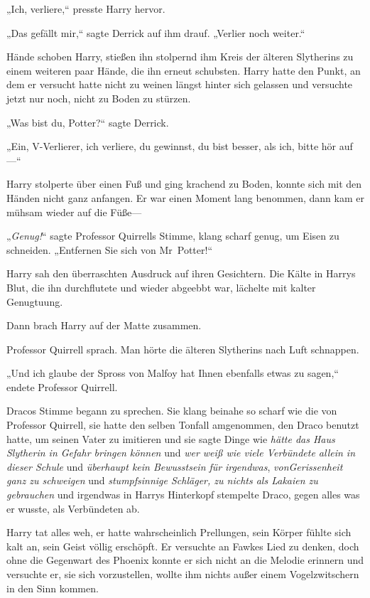 {„Ich, verliere,“ presste Harry hervor.

„Das gefällt mir,“ sagte Derrick auf ihm drauf. „Verlier noch weiter.“

\later

Hände schoben Harry, stießen ihn stolpernd ihm Kreis der älteren Slytherins zu einem weiteren paar Hände, die ihn erneut schubsten. Harry hatte den Punkt, an dem er versucht hatte nicht zu weinen längst hinter sich gelassen und versuchte jetzt nur noch, nicht zu Boden zu stürzen.

„Was bist du, Potter?“ sagte Derrick.

„Ein, V-Verlierer, ich verliere, du gewinnst, du bist besser, als ich, bitte hör auf—“

Harry stolperte über einen Fuß und ging krachend zu Boden, konnte sich mit den Händen nicht ganz anfangen. Er war einen Moment lang benommen, dann kam er mühsam wieder auf die Füße—

„\emph{Genug!}“ sagte Professor Quirrells Stimme, klang scharf genug, um Eisen zu schneiden. „Entfernen Sie sich von Mr~Potter!“

Harry sah den überraschten Ausdruck auf ihren Gesichtern. Die Kälte in Harrys Blut, die ihn durchflutete und wieder abgeebbt war, lächelte mit kalter Genugtuung.

Dann brach Harry auf der Matte zusammen.

Professor Quirrell sprach. Man hörte die älteren Slytherins nach Luft schnappen.

„Und ich glaube der Spross von Malfoy hat Ihnen ebenfalls etwas zu sagen,“ endete Professor Quirrell.

Dracos Stimme begann zu sprechen. Sie klang beinahe so scharf wie die von Professor Quirrell, sie hatte den selben Tonfall amgenommen, den Draco benutzt hatte, um seinen Vater zu imitieren und sie sagte Dinge wie \emph{hätte das Haus Slytherin in Gefahr bringen können} und \emph{wer weiß wie viele Verbündete allein in dieser Schule} und \emph{überhaupt kein Bewusstsein für} \emph{irgendwas}, \emph{vonGerissenheit ganz zu schweigen} und \emph{stumpfsinnige Schläger, zu nichts als Lakaien zu gebrauchen} und irgendwas in Harrys Hinterkopf stempelte Draco, gegen alles was er wusste, als Verbündeten ab.

Harry tat alles weh, er hatte wahrscheinlich Prellungen, sein Körper fühlte sich kalt an, sein Geist völlig erschöpft. Er versuchte an Fawkes Lied zu denken, doch ohne die Gegenwart des Phoenix konnte er sich nicht an die Melodie erinnern und versuchte er, sie sich vorzustellen, wollte ihm nichts außer einem Vogelzwitschern in den Sinn kommen.

}
